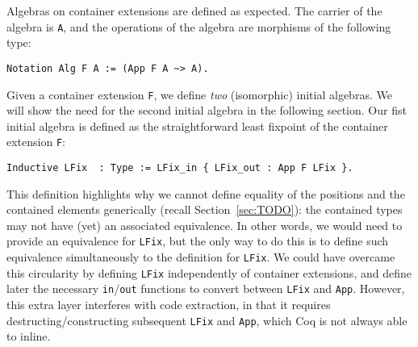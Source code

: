 \documentclass[a4paper, UKenglish, cleveref, autoref, thm-restate]{lipics-v2021}
\begin{document}
Algebras on container extensions are defined as expected. The carrier of the
algebra is \texttt{A}, and the operations of the algebra are morphisms
of the following type:
\begin{verbatim}
Notation Alg F A := (App F A ~> A).
\end{verbatim}
Given a container extension \texttt{F}, we define \emph{two}
(isomorphic) initial algebras. We will show the need for the second initial
algebra in the following section. Our fist initial algebra is defined as the
straightforward least fixpoint of the container extension \texttt{F}:
\begin{verbatim}
Inductive LFix  : Type := LFix_in { LFix_out : App F LFix }.
\end{verbatim}
This definition highlights why we cannot define equality of the positions and
the contained elements generically (recall Section~\ref{sec:TODO}): the
contained types may not have (yet) an associated equivalence. In other words,
we would need to provide an equivalence for \texttt{LFix}, but the
only way to do this is to define such equivalence simultaneously to the
definition for  \texttt{LFix}.  We could have overcame this
circularity by defining  \texttt{LFix} independently of container
extensions, and define later the necessary
\texttt{in}/\texttt{out} functions to convert between
\texttt{LFix} and \texttt{App}. However, this extra layer
interferes with code extraction, in that it requires destructing/constructing
subsequent \texttt{LFix} and  \texttt{App}, which Coq is not
always able to inline.
\end{document}
